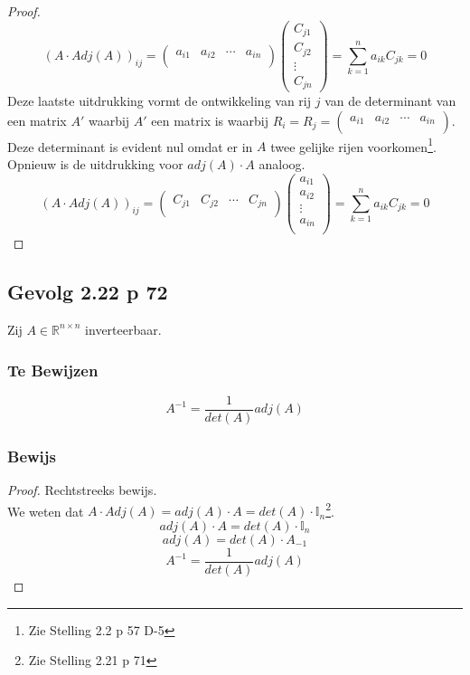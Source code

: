 \documentclass[lineaire_algebra_oplossingen.tex]{subfiles}
\begin{document}
\begin{proof}
\[
(A\cdot Adj(A))_{ij} =
\begin{pmatrix}
a_{i1} & a_{i2}&\cdots&a_{in}\\
\end{pmatrix}
\begin{pmatrix}
C_{j1}\\C_{j2}\\\vdots\\C_{jn}
\end{pmatrix}
=
\sum_{k=1}^na_{ik}C_{jk}
=0
\]
Deze laatste uitdrukking vormt de ontwikkeling van rij $j$ van de determinant van een matrix $A'$ waarbij $A'$ een matrix is waarbij $R_i = R_j = \begin{pmatrix}a_{i1} & a_{i2}&\cdots&a_{in}\\\end{pmatrix}$. Deze determinant is evident nul omdat er in $A$ twee gelijke rijen voorkomen\footnote{Zie Stelling 2.2 p 57 D-5}.\\
Opnieuw is de uitdrukking voor $adj(A) \cdot A$ analoog.
\[
(A\cdot Adj(A))_{ij} =
\begin{pmatrix}
C_{j1}&C_{j2}&\cdots&C_{jn}\\
\end{pmatrix}
\begin{pmatrix}
a_{i1}\\a_{i2}\\\vdots\\a_{in}\\
\end{pmatrix}
=
\sum_{k=1}^na_{ik}C_{jk}
=0
\]
\end{proof}


\subsection{Gevolg 2.22 p 72}
\label{2.22}
Zij $A \in \mathbb{R}^{n\times n}$ inverteerbaar.

\subsubsection*{Te Bewijzen}
\[
A^{-1} = \frac{1}{det(A)}adj(A)
\]

\subsubsection*{Bewijs}
\begin{proof}
Rechtstreeks bewijs.\\
We weten dat $A\cdot Adj(A) = adj(A) \cdot A = det(A)\cdot\mathbb{I}_n$\footnote{Zie Stelling 2.21 p 71}.
\[
adj(A) \cdot A = det(A)\cdot\mathbb{I}_n
\]
\[
adj(A) = det(A) \cdot A_{-1}
\]
\[
A^{-1} = \frac{1}{det(A)}adj(A)
\]
\end{proof}
\end{document}
